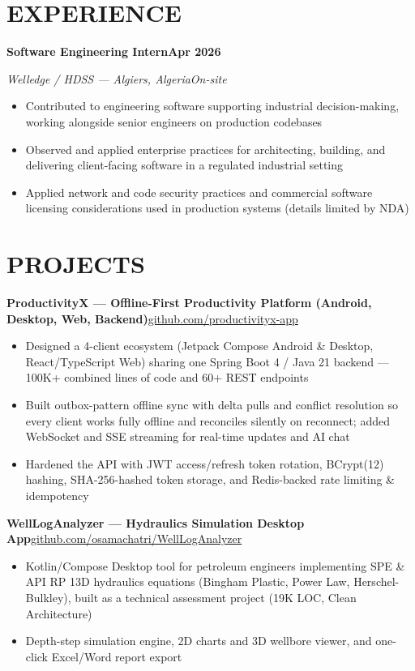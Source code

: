 \documentclass[10.5pt,letterpaper]{article}
\newcommand{\rsection}[1]{\section*{\MakeUppercase{\hspace{0pt}#1}}}
\newcommand{\entryhead}[4]{%
  {\condfont\bfseries\color{ink}\fontsize{10.3}{12}\selectfont #1}\hfill{\bfseries\small\color{accent}#2}\par
  {\itshape\small\color{muted}#3}\hfill{\itshape\small\color{muted}#4}\par
  \vspace{2pt}
}
\newcommand{\entrysimple}[2]{%
  {\condfont\bfseries\color{ink}\fontsize{10.3}{12}\selectfont #1}\hfill{\small\color{muted}#2}\par
}
\begin{document}
\rsection{Experience}
\entryhead{Software Engineering Intern}{Apr 2026}{Welledge / HDSS --- Algiers, Algeria}{On-site}
\begin{itemize}
  \item {\small\color{body}Contributed to engineering software supporting industrial decision-making, working alongside senior engineers on production codebases}
  \item {\small\color{body}Observed and applied enterprise practices for architecting, building, and delivering client-facing software in a regulated industrial setting}
  \item {\small\color{body}Applied network and code security practices and commercial software licensing considerations used in production systems \textcolor{muted}{(details limited by NDA)}}
\end{itemize}

\rsection{Projects}
\entrysimple{ProductivityX --- Offline-First Productivity Platform (Android, Desktop, Web, Backend)}{\href{https://github.com/productivityx-app}{github.com/productivityx-app}}
\vspace{2pt}
\begin{itemize}
  \item {\small\color{body}Designed a 4-client ecosystem (Jetpack Compose Android \& Desktop, React/TypeScript Web) sharing one Spring Boot 4 / Java 21 backend --- 100K+ combined lines of code and 60+ REST endpoints}
  \item {\small\color{body}Built outbox-pattern offline sync with delta pulls and conflict resolution so every client works fully offline and reconciles silently on reconnect; added WebSocket and SSE streaming for real-time updates and AI chat}
  \item {\small\color{body}Hardened the API with JWT access/refresh token rotation, BCrypt(12) hashing, SHA-256-hashed token storage, and Redis-backed rate limiting \& idempotency}
\end{itemize}
\vspace{3pt}

\entrysimple{WellLogAnalyzer --- Hydraulics Simulation Desktop App}{\href{https://github.com/osamachatri/WellLogAnalyzer}{github.com/osamachatri/WellLogAnalyzer}}
\vspace{2pt}
\begin{itemize}
  \item {\small\color{body}Kotlin/Compose Desktop tool for petroleum engineers implementing SPE \& API RP 13D hydraulics equations (Bingham Plastic, Power Law, Herschel-Bulkley), built as a technical assessment project (19K LOC, Clean Architecture)}
  \item {\small\color{body}Depth-step simulation engine, 2D charts and 3D wellbore viewer, and one-click Excel/Word report export}
\end{itemize}
\vspace{3pt}
\end{document}

